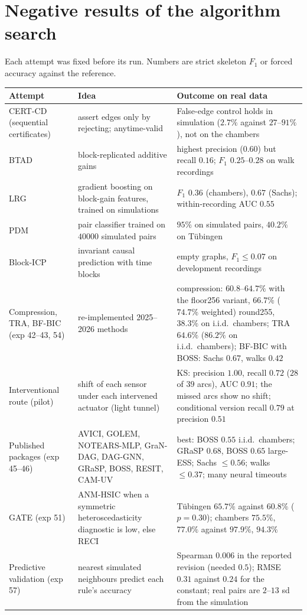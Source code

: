 \section{Negative results of the algorithm search}\label{app:negative}
Each attempt was fixed before its run. Numbers are strict skeleton $F_1$ or forced accuracy against the reference.
\begingroup\small\setlength{\tabcolsep}{3pt}
\begin{longtable}{@{}p{3.2cm}p{4.3cm}p{7.2cm}@{}}
\toprule
Attempt & Idea & Outcome on real data\\
\midrule
\endhead
CERT-CD (sequential certificates) & assert edges only by rejecting; anytime-valid & False-edge control holds in simulation ($2.7\%$ against $27$--$91\%$), not on the chambers\\
BTAD & block-replicated additive gains & highest precision ($0.60$) but recall $0.16$; $F_1$ $0.25$--$0.28$ on walk recordings\\
LRG & gradient boosting on block-gain features, trained on simulations & $F_1$ $0.36$ (chambers), $0.67$ (Sachs); within-recording AUC $0.55$\\
PDM & pair classifier trained on $40000$ simulated pairs & $95\%$ on simulated pairs, $40.2\%$ on T\"ubingen\\
Block-ICP & invariant causal prediction with time blocks & empty graphs, $F_1\le 0.07$ on development recordings\\
Compression, TRA, BF-BIC (exp 42--43, 54) & re-implemented 2025--2026 methods & compression: $60.8$--$64.7\%$ with the floor256 variant, $66.7\%$ ($74.7\%$ weighted) round255, $38.3\%$ on i.i.d.\ chambers; TRA $64.6\%$ ($86.2\%$ on i.i.d.\ chambers); BF-BIC with BOSS: Sachs $0.67$, walks $0.42$\\
Interventional route (pilot) & shift of each sensor under each intervened actuator (light tunnel) & KS: precision $1.00$, recall $0.72$ ($28$ of $39$ arcs), AUC $0.91$; the missed arcs show no shift; conditional version recall $0.79$ at precision $0.51$\\
Published packages (exp 45--46) & AVICI, GOLEM, NOTEARS-MLP, GraN-DAG, DAG-GNN, GRaSP, BOSS, RESIT, CAM-UV & best: BOSS $0.55$ i.i.d.\ chambers; GRaSP $0.68$, BOSS $0.65$ large-ESS; Sachs $\le0.56$; walks $\le0.37$; many neural timeouts\\
GATE (exp 51) & ANM-HSIC when a symmetric heteroscedasticity diagnostic is low, else RECI & T\"ubingen $65.7\%$ against $60.8\%$ ($p=0.30$); chambers $75.5\%$, $77.0\%$ against $97.9\%$, $94.3\%$\\
Predictive validation (exp 57) & nearest simulated neighbours predict each rule's accuracy & Spearman $0.006$ in the reported revision (needed $0.5$); RMSE $0.31$ against $0.24$ for the constant; real pairs are $2$--$13$ sd from the simulation\\
\bottomrule
\end{longtable}
\endgroup

